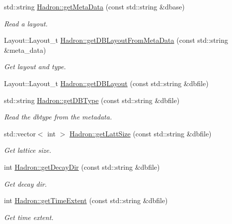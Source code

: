 \begin{DoxyCompactItemize}
\item 
std\+::string \mbox{\hyperlink{namespaceHadron_a6c9f3d44d269357faf4d786cc73ec742}{Hadron\+::get\+Meta\+Data}} (const std\+::string \&dbase)
\begin{DoxyCompactList}\small\item\em Read a layout. \end{DoxyCompactList}\item 
Layout\+::\+Layout\+\_\+t \mbox{\hyperlink{namespaceHadron_a5f888183d0cbdadea2ebdf51020f5042}{Hadron\+::get\+D\+B\+Layout\+From\+Meta\+Data}} (const std\+::string \&meta\+\_\+data)
\begin{DoxyCompactList}\small\item\em Get layout and type. \end{DoxyCompactList}\item 
Layout\+::\+Layout\+\_\+t \mbox{\hyperlink{namespaceHadron_af18d764aba83c32e26a22d75ed2dfbf7}{Hadron\+::get\+D\+B\+Layout}} (const std\+::string \&dbfile)
\item 
std\+::string \mbox{\hyperlink{namespaceHadron_a82284ec1545a1a6b6794da8d973a1d57}{Hadron\+::get\+D\+B\+Type}} (const std\+::string \&dbfile)
\begin{DoxyCompactList}\small\item\em Read the dbtype from the metadata. \end{DoxyCompactList}\item 
std\+::vector$<$ int $>$ \mbox{\hyperlink{namespaceHadron_aa639c858514f322eb7ee4c074924746a}{Hadron\+::get\+Latt\+Size}} (const std\+::string \&dbfile)
\begin{DoxyCompactList}\small\item\em Get lattice size. \end{DoxyCompactList}\item 
int \mbox{\hyperlink{namespaceHadron_ae5c5e7cd57aa116ce56262bf00762610}{Hadron\+::get\+Decay\+Dir}} (const std\+::string \&dbfile)
\begin{DoxyCompactList}\small\item\em Get decay dir. \end{DoxyCompactList}\item 
int \mbox{\hyperlink{namespaceHadron_a660c9f3adc1525c9d326b23398d09494}{Hadron\+::get\+Time\+Extent}} (const std\+::string \&dbfile)
\begin{DoxyCompactList}\small\item\em Get time extent. \end{DoxyCompactList}\end{DoxyCompactItemize}
